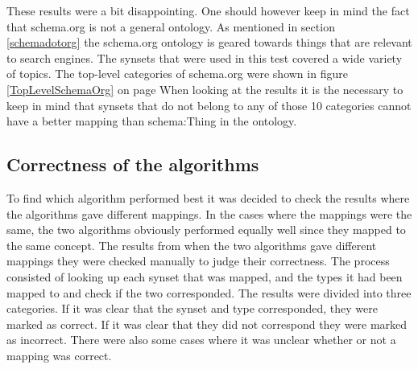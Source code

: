 These results were a bit disappointing.
One should however keep in mind the fact that schema.org is not a general ontology.
As mentioned in section \ref{schemadotorg} the schema.org ontology is geared towards things that are relevant to search engines.
The synsets that were used in this test covered a wide variety of topics.
The top-level categories of schema.org were shown in figure \ref {TopLevelSchemaOrg} on page \pageref{TopLevelSchemaOrg}
When looking at the results it is the necessary to keep in mind that
synsets that do not belong to any of those 10 categories cannot have a better mapping than schema:Thing in the ontology.

\subsection{Correctness of the algorithms}
To find which algorithm performed best it was decided to check the results where the algorithms gave different mappings.
In the cases where the mappings were the same, the two algorithms obviously performed equally well since they mapped to
the same concept.
The results from when the two algorithms gave different mappings they were checked manually to judge their correctness.
The process consisted of looking up each synset that was mapped,
and the types it had been mapped to and check if the two corresponded.
The results were divided into three categories.
If it was clear that the synset and type corresponded, they were marked as correct.
If it was clear that they did not correspond they were marked as incorrect.
There were also some cases where it was unclear whether or not a mapping was correct.

